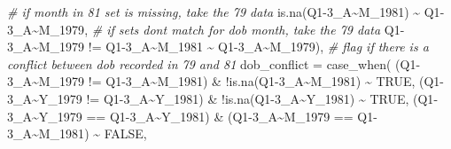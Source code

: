 \documentclass{article}
\newenvironment{Shaded}{\begin{snugshade}}{\end{snugshade}}
\newcommand{\AttributeTok}[1]{\textcolor[rgb]{0.77,0.63,0.00}{#1}}
\newcommand{\CommentTok}[1]{\textcolor[rgb]{0.56,0.35,0.01}{\textit{#1}}}
\newcommand{\ConstantTok}[1]{\textcolor[rgb]{0.00,0.00,0.00}{#1}}
\newcommand{\FunctionTok}[1]{\textcolor[rgb]{0.00,0.00,0.00}{#1}}
\newcommand{\NormalTok}[1]{#1}
\newcommand{\SpecialCharTok}[1]{\textcolor[rgb]{0.00,0.00,0.00}{#1}}
\newcommand{\StringTok}[1]{\textcolor[rgb]{0.31,0.60,0.02}{#1}}
\begin{document}
\begin{Shaded}
\begin{Highlighting}[]
                    \CommentTok{\# if month in 81 set is missing, take the 79 data}
                    \FunctionTok{is.na}\NormalTok{(}\StringTok{\textasciigrave{}}\AttributeTok{Q1{-}3\_A\textasciitilde{}M\_1981}\StringTok{\textasciigrave{}}\NormalTok{) }\SpecialCharTok{\textasciitilde{}} \StringTok{\textasciigrave{}}\AttributeTok{Q1{-}3\_A\textasciitilde{}M\_1979}\StringTok{\textasciigrave{}}\NormalTok{,}
                    \CommentTok{\# if sets don\textquotesingle{}t match for dob month, take the 79 data}
                    \StringTok{\textasciigrave{}}\AttributeTok{Q1{-}3\_A\textasciitilde{}M\_1979}\StringTok{\textasciigrave{}} \SpecialCharTok{!=} \StringTok{\textasciigrave{}}\AttributeTok{Q1{-}3\_A\textasciitilde{}M\_1981}\StringTok{\textasciigrave{}} \SpecialCharTok{\textasciitilde{}} \StringTok{\textasciigrave{}}\AttributeTok{Q1{-}3\_A\textasciitilde{}M\_1979}\StringTok{\textasciigrave{}}\NormalTok{),}
        \CommentTok{\# flag if there is a conflict between dob recorded in 79 and 81}
        \AttributeTok{dob\_conflict =} \FunctionTok{case\_when}\NormalTok{(     }
\NormalTok{                      (}\StringTok{\textasciigrave{}}\AttributeTok{Q1{-}3\_A\textasciitilde{}M\_1979}\StringTok{\textasciigrave{}} \SpecialCharTok{!=} \StringTok{\textasciigrave{}}\AttributeTok{Q1{-}3\_A\textasciitilde{}M\_1981}\StringTok{\textasciigrave{}}\NormalTok{) }\SpecialCharTok{\&} \SpecialCharTok{!}\FunctionTok{is.na}\NormalTok{(}\StringTok{\textasciigrave{}}\AttributeTok{Q1{-}3\_A\textasciitilde{}M\_1981}\StringTok{\textasciigrave{}}\NormalTok{)}
                      \SpecialCharTok{\textasciitilde{}} \ConstantTok{TRUE}\NormalTok{,}
\NormalTok{                      (}\StringTok{\textasciigrave{}}\AttributeTok{Q1{-}3\_A\textasciitilde{}Y\_1979}\StringTok{\textasciigrave{}} \SpecialCharTok{!=} \StringTok{\textasciigrave{}}\AttributeTok{Q1{-}3\_A\textasciitilde{}Y\_1981}\StringTok{\textasciigrave{}}\NormalTok{) }\SpecialCharTok{\&} \SpecialCharTok{!}\FunctionTok{is.na}\NormalTok{(}\StringTok{\textasciigrave{}}\AttributeTok{Q1{-}3\_A\textasciitilde{}Y\_1981}\StringTok{\textasciigrave{}}\NormalTok{)}
                      \SpecialCharTok{\textasciitilde{}} \ConstantTok{TRUE}\NormalTok{,}
\NormalTok{                      (}\StringTok{\textasciigrave{}}\AttributeTok{Q1{-}3\_A\textasciitilde{}Y\_1979}\StringTok{\textasciigrave{}} \SpecialCharTok{==} \StringTok{\textasciigrave{}}\AttributeTok{Q1{-}3\_A\textasciitilde{}Y\_1981}\StringTok{\textasciigrave{}}\NormalTok{) }\SpecialCharTok{\&} 
\NormalTok{                      (}\StringTok{\textasciigrave{}}\AttributeTok{Q1{-}3\_A\textasciitilde{}M\_1979}\StringTok{\textasciigrave{}} \SpecialCharTok{==} \StringTok{\textasciigrave{}}\AttributeTok{Q1{-}3\_A\textasciitilde{}M\_1981}\StringTok{\textasciigrave{}}\NormalTok{) }\SpecialCharTok{\textasciitilde{}} \ConstantTok{FALSE}\NormalTok{,}

\end{Highlighting}
\end{Shaded}
\end{document}
